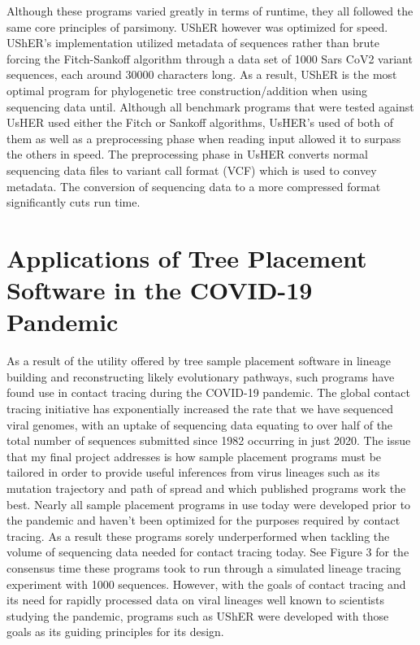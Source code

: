 \documentclass[12pt,journal,compsoc]{IEEEtran}
\begin{document}
Although these programs varied greatly in terms of runtime, they all followed the same core principles of parsimony. UShER however was optimized for speed. UShER’s implementation utilized metadata of sequences rather than brute forcing the Fitch-Sankoff algorithm through a data set of 1000 Sars CoV2 variant sequences, each around 30000 characters long. As a result, UShER is the most optimal program for phylogenetic tree construction/addition when using sequencing data until. Although all benchmark programs that were tested against UsHER used either the Fitch or Sankoff algorithms, UsHER’s used of both of them as well as a preprocessing phase when reading input allowed it to surpass the others in speed. The preprocessing phase in UsHER converts normal sequencing data files to variant call format (VCF) which is used to convey metadata. The conversion of sequencing data to a more compressed format significantly cuts run time.


\section{Applications of Tree Placement Software in the COVID-19 Pandemic}
 As a result of the utility offered by tree sample placement software in lineage building and reconstructing likely evolutionary pathways, such programs have found use in contact tracing during the COVID-19 pandemic. The global contact tracing initiative has exponentially increased the rate that we have sequenced viral genomes, with an  uptake  of sequencing data equating to over half of the total number of sequences submitted since 1982 occurring in just 2020. The issue that my final  project addresses is how sample placement programs must be tailored in order to provide useful inferences from virus lineages such as its mutation trajectory and path of spread and which published programs work the best. Nearly all  sample placement programs in use today were developed prior to the pandemic and haven’t been optimized for the purposes required by contact tracing. As a result these programs sorely underperformed when tackling the volume of sequencing data needed for contact tracing today. See Figure 3 for the consensus time these programs took to run through a simulated lineage tracing experiment with 1000 sequences. However, with the goals of contact tracing and its need for rapidly processed data on viral lineages well known to scientists studying the pandemic, programs such as UShER were developed with those goals as its guiding principles for its design.
 
\end{document}
